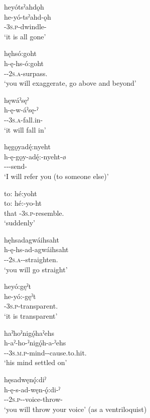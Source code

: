 \ex heyótsˀahdǫh\\
\gll he-yó-tsˀahd-ǫh\\
{\translocative}-\textsc{3s.p}-dwindle-{\stative}\\
\glt `it is all gone'

\ex hęhsó:goht\\
\gll h-ę-hs-ó:goht\\
{\translocative}-{\future}-\textsc{2s.a}-surpass.{\zeropunctual}\\
\glt `you will exaggerate, go above and beyond'


\ex hęwáˀsęˀ\\
\gll h-ę-w-áˀsę-ˀ\\
{\translocative}-{\future}-\textsc{3s.a}-fall.in-{\punctual}\\
\glt `it will fall in'

\ex hęgǫyadę́:nyeht\\
\gll h-ę-gǫy-adę́:-nyeht-ø\\
{\translocative}-{\future}--send-{\punctual}\\
\glt `I will refer you (to someone else)'

\ex to: hé:yoht\\
\gll to:  hé:-yo-ht\\
that {\translocative}-\textsc{3s.p}-resemble.{\stative}\\
\glt `suddenly'

\ex hęhsadagwáihsaht\\
\gll h-ę-hs-ad-agwáihsaht\\
{\translocative}-{\future}-\textsc{2s.a}-{\semireflexive}-straighten.{\zeropunctual}\\
\glt `you will go straight'

\ex heyó:gęˀt\\
\gll he-yó:-gęˀt\\
{\translocative}-\textsc{3s.p}-transparent.{\stative}\\
\glt `it is transparent'

\ex haˀhoˀnigǫ́haˀehs\\
\gll h-aˀ-ho-ˀnigǫ́h-a-ˀehs\\
{\translocative}-{\factual}-\textsc{3s.m.p}-mind-{\joinerA}-cause.to.\-hit.{\zeropunctual}\\
\glt `his mind settled on'

\ex hęsadwęnǫ́:diˀ\\
\gll h-ę-s-ad-węn-ǫ́:di-ˀ\\
{\translocative}-{\future}-\textsc{2s.p}-{\semireflexive}-voice-throw-{\punctual}\\
\glt `you will throw your voice' (as a ventriloquist)

